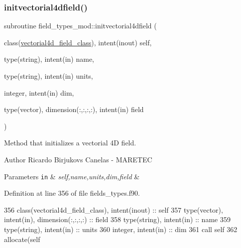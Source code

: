 \subsubsection{\texorpdfstring{initvectorial4dfield()}{initvectorial4dfield()}}
{\footnotesize\ttfamily subroutine field\+\_\+types\+\_\+mod\+::initvectorial4dfield (\begin{DoxyParamCaption}\item[{class(\mbox{\hyperlink{structfield__types__mod_1_1vectorial4d__field__class}{vectorial4d\+\_\+field\+\_\+class}}), intent(inout)}]{self,  }\item[{type(string), intent(in)}]{name,  }\item[{type(string), intent(in)}]{units,  }\item[{integer, intent(in)}]{dim,  }\item[{type(vector), dimension(\+:,\+:,\+:,\+:), intent(in)}]{field }\end{DoxyParamCaption})\hspace{0.3cm}{\ttfamily [private]}}



Method that initializes a vectorial 4D field. 

\begin{DoxyAuthor}{Author}
Ricardo Birjukovs Canelas -\/ M\+A\+R\+E\+T\+EC 
\end{DoxyAuthor}

\begin{DoxyParams}[1]{Parameters}
\mbox{\tt in}  & {\em self,name,units,dim,field} & \\
\hline
\end{DoxyParams}


Definition at line 356 of file fields\+\_\+types.\+f90.


\begin{DoxyCode}
356     \textcolor{keywordtype}{class}(vectorial4d\_field\_class), \textcolor{keywordtype}{intent(inout)} :: self
357     \textcolor{keywordtype}{type}(vector), \textcolor{keywordtype}{intent(in)}, \textcolor{keywordtype}{dimension(:,:,:,:)} :: field
358     \textcolor{keywordtype}{type}(string), \textcolor{keywordtype}{intent(in)} :: name
359     \textcolor{keywordtype}{type}(string), \textcolor{keywordtype}{intent(in)} :: units
360     \textcolor{keywordtype}{integer}, \textcolor{keywordtype}{intent(in)} :: dim
361     \textcolor{keyword}{call }self%
362     \textcolor{keyword}{allocate}(self%
\end{DoxyCode}
\mbox{\label{namespacefield__types__mod_aaf5716bf674e6caa4d8a9f3a14a5b393}} 
